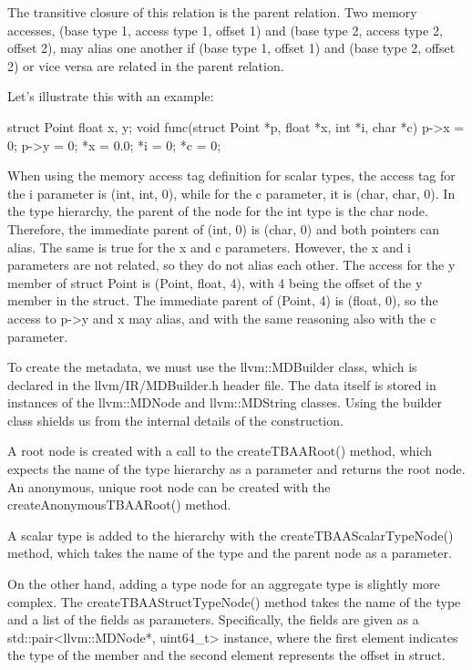The transitive closure of this relation is the parent relation. Two memory accesses, (base type 1, access type 1, offset 1) and (base type 2, access type 2, offset 2), may alias one another if (base type 1, offset 1) and (base type 2, offset 2) or vice versa are related in the parent relation.

Let’s illustrate this with an example:

\begin{cpp}
struct Point { float x, y; }
void func(struct Point *p, float *x, int *i, char *c) {
    p->x = 0; p->y = 0; *x = 0.0; *i = 0; *c = 0;
}
\end{cpp}

When using the memory access tag definition for scalar types, the access tag for the i parameter is (int, int, 0), while for the c parameter, it is (char, char, 0). In the type hierarchy, the parent of the node for the int type is the char node. Therefore, the immediate parent of (int, 0) is (char, 0) and both pointers can alias. The same is true for the x and c parameters. However, the x and i parameters are not related, so they do not alias each other. The access for the y member of struct Point is (Point, float, 4), with 4 being the offset of the y member in the struct. The immediate parent of (Point, 4) is (float, 0), so the access to p->y and x may alias, and with the same reasoning also with the c parameter.


To create the metadata, we must use the llvm::MDBuilder class, which is declared in the llvm/IR/MDBuilder.h header file. The data itself is stored in instances of the llvm::MDNode and llvm::MDString classes. Using the builder class shields us from the internal details of the construction.

A root node is created with a call to the createTBAARoot() method, which expects the name of the type hierarchy as a parameter and returns the root node. An anonymous, unique root node can be created with the createAnonymousTBAARoot() method.

A scalar type is added to the hierarchy with the createTBAAScalarTypeNode() method, which takes the name of the type and the parent node as a parameter.

On the other hand, adding a type node for an aggregate type is slightly more complex. The createTBAAStructTypeNode() method takes the name of the type and a list of the fields as parameters. Specifically, the fields are given as a std::pair<llvm::MDNode*, uint64\_t> instance, where the first element indicates the type of the member and the second element represents the offset in struct.

